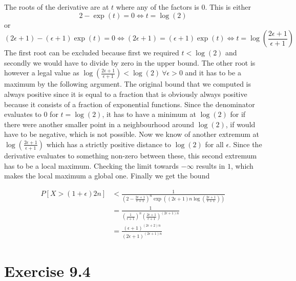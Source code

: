 \documentclass[10pt,a4paper]{article}
\begin{document}
The roots of the derivative are at $t$ where any of the factors is $0$.
This is either
\begin{equation*}
  2 - \exp(t) = 0 \Leftrightarrow t = \log(2)
\end{equation*}
or
\begin{equation*}
  (2\epsilon + 1) - (\epsilon + 1)\exp(t) = 0 \Leftrightarrow (2\epsilon + 1) = (\epsilon + 1)\exp(t) \Leftrightarrow t = \log\left( \frac{2\epsilon + 1}{\epsilon + 1} \right)
\end{equation*}
The first root can be excluded because first we required $t < \log(2)$ and secondly we would have to divide by zero in the upper bound.
The other root is however a legal value as $\log\left( \frac{2\epsilon + 1}{\epsilon + 1} \right) < \log(2)\ \forall \epsilon > 0$ and it has to be a maximum by the following argument.
The original bound that we computed is always positive since it is equal to a fraction that is obviously always positive because it consists of a fraction of exponential functions.
Since the denominator evaluates to $0$ for $t = \log(2)$, it has to have a minimum at $\log(2)$ for if there were another smaller point in a neighbourhood around $\log(2)$, if would have to be negative, which is not possible.
Now we know of another extremum at $\log\left( \frac{2\epsilon + 1}{\epsilon + 1} \right)$ which has a strictly positive distance to $\log(2)$ for all $\epsilon$.
Since the derivative evaluates to something non-zero between these, this second extremum has to be a local maximum.
Checking the limit towards $-\infty$ results in $1$, which makes the local maximum a global one.
Finally we get the bound

\begin{align*}
  P[X > (1 + \epsilon)2n] & < \frac{1}{\left(2 - \frac{2\epsilon + 1}{\epsilon + 1} \right)^{n} \exp\left( (2\epsilon + 1)n\log\left( \frac{2\epsilon + 1}{\epsilon + 1} \right) \right)}\\
                          & = \frac{1}{\left(\frac{1}{\epsilon + 1} \right)^{n}\left( \frac{2\epsilon + 1}{\epsilon + 1} \right)^{(2\epsilon + 1)n}}\\
                          & = \frac{(\epsilon + 1)^{(2\epsilon + 2)n}}{(2\epsilon + 1)^{(2\epsilon + 1)n}}
\end{align*}

\section*{Exercise 9.4}
\end{document}
